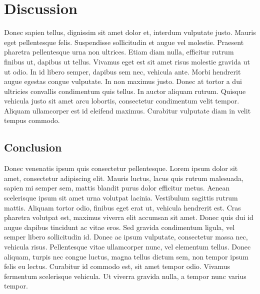 \documentclass[
    colorlinks=true,        %
    linkcolor=black,          %
    anchorcolor=black,      %
    citecolor=black,         %
    urlcolor=black,          %
    bookmarks=true,         %
    bookmarksopen=false,    %
    bookmarksnumbered=true,  %
    dvipsnames
]{MAE}
\begin{document}
\section{Discussion}
\label{sec:5}

Donec sapien tellus, dignissim sit amet dolor et, interdum vulputate justo. Mauris eget pellentesque felis. Suspendisse sollicitudin et augue vel molestie. Praesent pharetra pellentesque urna non ultrices. Etiam diam nulla, efficitur rutrum finibus ut, dapibus ut tellus. Vivamus eget est sit amet risus molestie gravida ut ut odio. In id libero semper, dapibus sem nec, vehicula ante. Morbi hendrerit augue egestas congue vulputate. In non maximus justo. Donec at tortor a dui ultricies convallis condimentum quis tellus. In auctor aliquam rutrum. Quisque vehicula justo sit amet arcu lobortis, consectetur condimentum velit tempor. Aliquam ullamcorper est id eleifend maximus. Curabitur vulputate diam in velit tempus commodo.

\subsection{Conclusion}

Donec venenatis ipsum quis consectetur pellentesque. Lorem ipsum dolor sit amet, consectetur adipiscing elit. Mauris luctus, lacus quis rutrum malesuada, sapien mi semper sem, mattis blandit purus dolor efficitur metus. Aenean scelerisque ipsum sit amet urna volutpat lacinia. Vestibulum sagittis rutrum mattis. Aliquam tortor odio, finibus eget erat ut, vehicula hendrerit est. Cras pharetra volutpat est, maximus viverra elit accumsan sit amet. Donec quis dui id augue dapibus tincidunt ac vitae eros. Sed gravida condimentum ligula, vel semper libero sollicitudin id. Donec ac ipsum vulputate, consectetur massa nec, vehicula risus. Pellentesque vitae ullamcorper nunc, vel elementum tellus. Donec aliquam, turpis nec congue luctus, magna tellus dictum sem, non tempor ipsum felis eu lectus. Curabitur id commodo est, sit amet tempor odio. Vivamus fermentum scelerisque vehicula. Ut viverra gravida nulla, a tempor nunc varius tempor.

\printbibliography

\appendix






\end{document}

